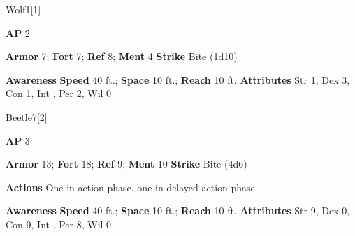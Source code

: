 \begin{monsection}{Wolf}{1}[1]
\vspace{-1em}\vspace{-1em}
\begin{spellcontent}
\begin{spelltargetinginfo}
{\textbf{AP} 2}

\pari \textbf{Armor} 7;
\textbf{Fort} 7;
\textbf{Ref} 8;
\textbf{Ment} 4
\pari \textbf{Strike} Bite  (1d10)



\end{spelltargetinginfo}


\end{spellcontent}

\begin{monsterfooter}
\pari \textbf{Awareness} 
\pari \textbf{Speed} 40 ft.;
\textbf{Space} 10 ft.;
\textbf{Reach} 10 ft.
\pari \textbf{Attributes}
Str 1,
Dex 3,
Con 1,
Int ,
Per 2,
Wil 0
\end{monsterfooter}
\end{monsection}



\begin{monsection}[Dire]{Beetle}{7}[2]
\vspace{-1em}\vspace{-1em}
\begin{spellcontent}
\begin{spelltargetinginfo}
{\textbf{AP} 3}

\pari \textbf{Armor} 13;
\textbf{Fort} 18;
\textbf{Ref} 9;
\textbf{Ment} 10
\pari \textbf{Strike} Bite  (4d6)


\pari \textbf{Actions} One in action phase, one in delayed action phase
\end{spelltargetinginfo}


\end{spellcontent}

\begin{monsterfooter}
\pari \textbf{Awareness} 
\pari \textbf{Speed} 40 ft.;
\textbf{Space} 10 ft.;
\textbf{Reach} 10 ft.
\pari \textbf{Attributes}
Str 9,
Dex 0,
Con 9,
Int ,
Per 8,
Wil 0
\end{monsterfooter}
\end{monsection}



